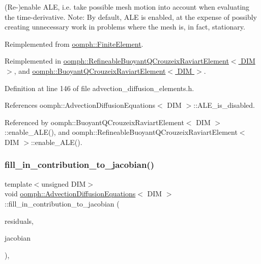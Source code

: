 (Re-\/)enable A\+LE, i.\+e. take possible mesh motion into account when evaluating the time-\/derivative. Note\+: By default, A\+LE is enabled, at the expense of possibly creating unnecessary work in problems where the mesh is, in fact, stationary. 



Reimplemented from \hyperlink{classoomph_1_1FiniteElement_a92ef8967fa4e2d6c33c51ea3efa3aa82}{oomph\+::\+Finite\+Element}.



Reimplemented in \hyperlink{classoomph_1_1RefineableBuoyantQCrouzeixRaviartElement_a7006ef1edd1ac4a178e38945fae581ee}{oomph\+::\+Refineable\+Buoyant\+Q\+Crouzeix\+Raviart\+Element$<$ D\+I\+M $>$}, and \hyperlink{classoomph_1_1BuoyantQCrouzeixRaviartElement_af551bb70aa118a8db4498f41272fe776}{oomph\+::\+Buoyant\+Q\+Crouzeix\+Raviart\+Element$<$ D\+I\+M $>$}.



Definition at line 146 of file advection\+\_\+diffusion\+\_\+elements.\+h.



References oomph\+::\+Advection\+Diffusion\+Equations$<$ D\+I\+M $>$\+::\+A\+L\+E\+\_\+is\+\_\+disabled.



Referenced by oomph\+::\+Buoyant\+Q\+Crouzeix\+Raviart\+Element$<$ D\+I\+M $>$\+::enable\+\_\+\+A\+L\+E(), and oomph\+::\+Refineable\+Buoyant\+Q\+Crouzeix\+Raviart\+Element$<$ D\+I\+M $>$\+::enable\+\_\+\+A\+L\+E().

\mbox{\label{classoomph_1_1AdvectionDiffusionEquations_a6ec1e0f92fa79998be9340ecfda4bcd5}} 
\subsubsection{\texorpdfstring{fill\+\_\+in\+\_\+contribution\+\_\+to\+\_\+jacobian()}{fill\_in\_contribution\_to\_jacobian()}}
{\footnotesize\ttfamily template$<$unsigned D\+IM$>$ \\
void \hyperlink{classoomph_1_1AdvectionDiffusionEquations}{oomph\+::\+Advection\+Diffusion\+Equations}$<$ D\+IM $>$\+::fill\+\_\+in\+\_\+contribution\+\_\+to\+\_\+jacobian (\begin{DoxyParamCaption}\item[{\hyperlink{classoomph_1_1Vector}{Vector}$<$ double $>$ \&}]{residuals,  }\item[{\hyperlink{classoomph_1_1DenseMatrix}{Dense\+Matrix}$<$ double $>$ \&}]{jacobian }\end{DoxyParamCaption})\hspace{0.3cm}{\ttfamily [inline]}, {\ttfamily [virtual]}}



